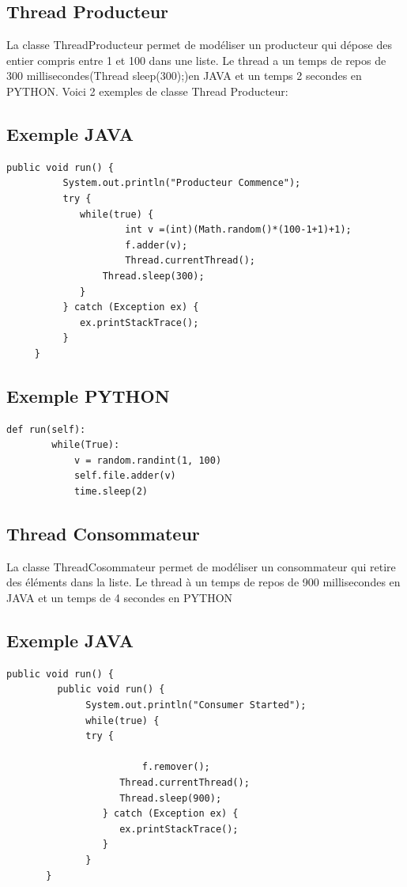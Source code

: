 \documentclass[13pt]{article}
\begin{document}
\subsection{Thread Producteur}
La classe ThreadProducteur permet de modéliser un producteur qui dépose des entier compris entre 1 et 100 dans une liste. Le thread a un temps de repos de 300 millisecondes(Thread sleep(300);)en JAVA et un temps 2 secondes en PYTHON. Voici 2 exemples de classe Thread Producteur:

\subsection{Exemple JAVA}
\begin{verbatim}
public void run() {
	      System.out.println("Producteur Commence");
	      try {
	         while(true) {
	        		 int v =(int)(Math.random()*(100-1+1)+1);
	        		 f.adder(v);
	        		 Thread.currentThread();
				 Thread.sleep(300);
	         }
	      } catch (Exception ex) {
	         ex.printStackTrace();
	      }
	 }    
\end{verbatim}
\subsection{Exemple PYTHON}
\begin{verbatim}
def run(self):
        while(True):
            v = random.randint(1, 100)
            self.file.adder(v)
            time.sleep(2)
\end{verbatim}
\subsection{Thread Consommateur}
La classe ThreadCosommateur permet de modéliser un consommateur qui retire des éléments dans la liste. Le thread à un temps de repos de 900 millisecondes en JAVA et un temps de 4 secondes en PYTHON

\subsection{Exemple JAVA}
\begin{verbatim}
public void run() {
	     public void run() {
		      System.out.println("Consumer Started");
		      while(true) {
		      try {
		    	  	
		    	  		f.remover();
		            Thread.currentThread();
					Thread.sleep(900);
		         } catch (Exception ex) {
		            ex.printStackTrace();
		         }
		      }
	   }
\end{verbatim}
\end{document}
